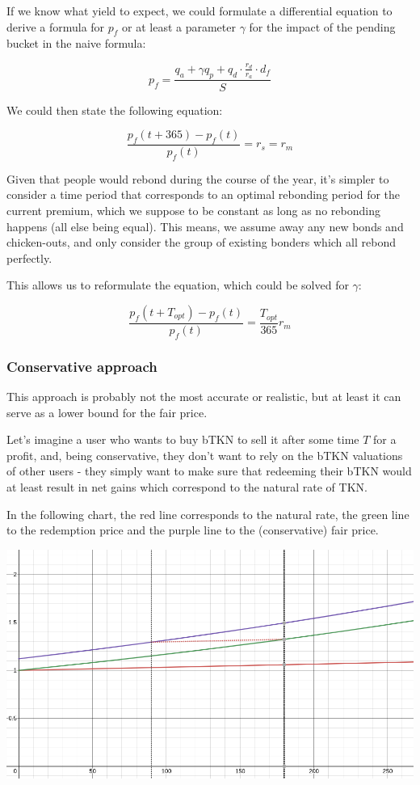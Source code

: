 \documentclass{article}
\begin{document}
If we know what yield to expect, we could formulate a differential equation to derive a formula for $p_f$ or at least a parameter $\gamma$ for the impact of the pending bucket in the naive formula:

\begin{equation}
  \label{eq:naive-beta}
   p_f = \frac{q_a + \gamma q_p + q_d \cdot \frac{r_d}{r_a} \cdot d_f}{S}
\end{equation}

We could then state the following equation:

\begin{equation}
  \label{eq:yield-eq}
  \frac{p_f(t + 365) - p_f(t)}{p_f(t)} = r_s = r_m 
\end{equation}

Given that people would rebond during the course of the year, it’s simpler to consider a time period that corresponds to an optimal rebonding period for the current premium, which we suppose to be constant as long as no rebonding happens (all else being equal). This means, we assume away any new bonds and chicken-outs, and only consider the group of existing bonders which all rebond perfectly.

This allows us to reformulate the equation, which could be solved for $\gamma$:

\begin{equation}
  \label{eq:yield-eq}
  \frac{p_f(t + T_{opt}) - p_f(t)}{p_f(t)} = \frac{T_{opt}}{365} r_m
\end{equation}

\subsubsection{Conservative approach}
This approach is probably not the most accurate or realistic, but at least it can serve as a lower bound for the fair price.

Let’s imagine a user who wants to buy bTKN to sell it after some time $T$ for a profit, and, being conservative, they don’t want to rely on the bTKN valuations of other users - they simply want to make sure that redeeming their bTKN would at least result in net gains which correspond to the natural rate of TKN.

In the following chart, the red line corresponds to the natural rate, the green line to the redemption price and the purple line to the (conservative) fair price.

\includegraphics[width=\linewidth]{./ChickenBonds_Whitepaper_conservative_price.png}
\end{document}
